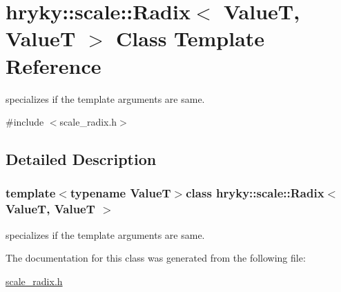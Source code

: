 \hypertarget{classhryky_1_1scale_1_1_radix_3_01_value_t_00_01_value_t_01_4}{\section{hryky\-:\-:scale\-:\-:Radix$<$ Value\-T, Value\-T $>$ Class Template Reference}
\label{classhryky_1_1scale_1_1_radix_3_01_value_t_00_01_value_t_01_4}
}


specializes if the template arguments are same.  




{\ttfamily \#include $<$scale\-\_\-radix.\-h$>$}



\subsection{Detailed Description}
\subsubsection*{template$<$typename Value\-T$>$class hryky\-::scale\-::\-Radix$<$ Value\-T, Value\-T $>$}

specializes if the template arguments are same. 

The documentation for this class was generated from the following file\-:\begin{DoxyCompactItemize}
\item 
\hyperlink{scale__radix_8h}{scale\-\_\-radix.\-h}\end{DoxyCompactItemize}

